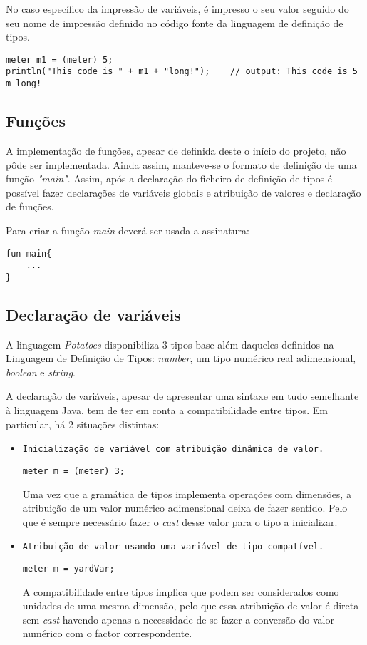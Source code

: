 \documentclass{report}
\begin{document}
No caso específico da impressão de variáveis, é impresso o seu valor seguido do seu nome de impressão definido no código fonte da linguagem de definição de tipos.
\begin{lstlisting}[caption= Linguagem General-Purpose - Impressão]
meter m1 = (meter) 5;
println("This code is " + m1 + "long!");    // output: This code is 5 m long!
\end{lstlisting}

\subsection{Funções}
A implementação de funções, apesar de definida deste o início do projeto, não pôde ser implementada. Ainda assim, manteve-se o formato de definição de uma função \textit{"main"}. Assim, após a declaração do ficheiro de definição de tipos é possível fazer declarações de variáveis globais e atribuição de valores e declaração de funções. 

Para criar a função \textit{main} deverá ser usada a assinatura:
\begin{lstlisting}[caption= Linguagem General-Purpose - Assinatura da Função \textit{Main}]
fun main{
    ...
}
\end{lstlisting}
\subsection{Declaração de variáveis}
A linguagem \textit{Potatoes} disponibiliza 3 tipos base além daqueles definidos na Linguagem de Definição de Tipos: \textit{number}, um tipo numérico real adimensional, \textit{boolean} e \textit{string}.

A declaração de variáveis, apesar de apresentar uma sintaxe em tudo semelhante à linguagem Java, tem de ter em conta a compatibilidade entre tipos. Em particular, há 2 situações distintas:

\begin{itemize}

\item \texttt{Inicialização de variável com atribuição dinâmica de valor.}
\begin{lstlisting}
meter m = (meter) 3;
\end{lstlisting}
Uma vez que a gramática de tipos implementa operações com dimensões, a atribuição de um valor numérico adimensional deixa de fazer sentido. Pelo que é sempre necessário fazer o \textit{cast} desse valor para o tipo a inicializar.

\item \texttt{Atribuição de valor usando uma variável de tipo compatível.}
\begin{lstlisting}
meter m = yardVar;
\end{lstlisting}
A compatibilidade entre tipos implica que podem ser considerados como unidades de uma mesma dimensão, pelo que essa atribuição de valor é direta sem \textit{cast} havendo apenas a necessidade de se fazer a conversão do valor numérico com o factor correspondente.

\end{itemize}
\end{document}
